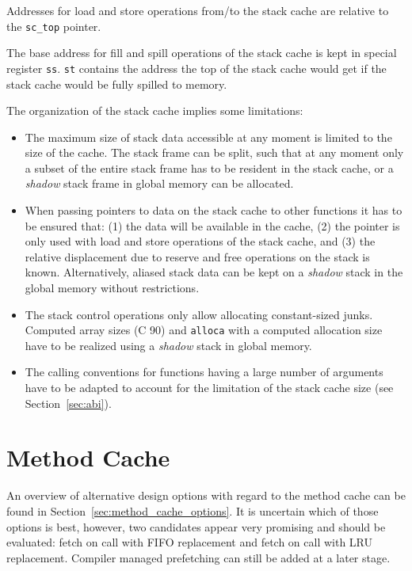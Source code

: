 \documentclass[a4paper,fontsize=10pt,twoside,DIV15,BCOR12mm,headinclude=true,footinclude=false,pagesize,bibtotoc]{scrbook}
\newcommand{\code}[1]{{\texttt{#1}}}
\begin{document}
Addresses for load and store operations from/to the stack cache are relative to
the \code{sc\_top} pointer.

The base address for fill and spill operations of the stack cache is kept in
special register \texttt{ss}. \texttt{st} contains the address the top of the
stack cache would get if the stack cache would be fully spilled to memory.

The organization of the stack cache implies some limitations:
\begin{itemize}
  \item The maximum size of stack data accessible at any moment is limited to
        the size of the cache. The stack frame can be split, such that at any
        moment only a subset of the entire stack frame has to be resident in the
        stack cache, or a \emph{shadow} stack frame in global memory can be
        allocated.
  \item When passing pointers to data on the stack cache to other functions it
        has to be ensured that: (1) the data will be available in the cache, (2)
        the pointer is only used  with load and store operations of the stack
        cache, and (3) the relative displacement due to reserve and free
        operations on the stack is known. Alternatively, aliased stack data can
        be kept on a \emph{shadow} stack in the global memory without
        restrictions.
  \item The stack control operations only allow allocating constant-sized junks.
        Computed array sizes (C 90) and \texttt{alloca} with a computed
        allocation size have to be realized using a \emph{shadow} stack in
        global memory.
  \item The calling conventions for functions having a large number of arguments
        have to be adapted to account for the limitation of the stack cache
        size (see Section~\ref{sec:abi}).
\end{itemize}



\section{Method Cache}
\label{sec:method-cache}

An overview of alternative design options with regard to the method cache can be
found in Section~\ref{sec:method_cache_options}. It is uncertain which of those
options is best, however, two candidates appear very promising and should
be evaluated: fetch on call with FIFO replacement and fetch on call with LRU
replacement. Compiler managed prefetching can still be added at a later stage.
\end{document}
